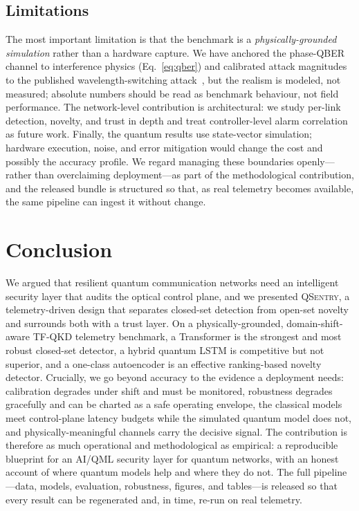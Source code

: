 \documentclass[runningheads]{llncs}
\begin{document}
\subsection{Limitations}
The most important limitation is that the benchmark is a \emph{physically-grounded simulation} rather than a hardware capture. We have anchored the phase-QBER channel to interference physics (Eq.~\eqref{eq:qber}) and calibrated attack magnitudes to the published wavelength-switching attack~\cite{peng}, but the realism is modeled, not measured; absolute numbers should be read as benchmark behaviour, not field performance. The network-level contribution is architectural: we study per-link detection, novelty, and trust in depth and treat controller-level alarm correlation as future work. Finally, the quantum results use state-vector simulation; hardware execution, noise, and error mitigation would change the cost and possibly the accuracy profile. We regard managing these boundaries openly---rather than overclaiming deployment---as part of the methodological contribution, and the released bundle is structured so that, as real telemetry becomes available, the same pipeline can ingest it without change.

\section{Conclusion}
We argued that resilient quantum communication networks need an intelligent security layer that audits the optical control plane, and we presented \textsc{QSentry}, a telemetry-driven design that separates closed-set detection from open-set novelty and surrounds both with a trust layer. On a physically-grounded, domain-shift-aware TF-QKD telemetry benchmark, a Transformer is the strongest and most robust closed-set detector, a hybrid quantum LSTM is competitive but not superior, and a one-class autoencoder is an effective ranking-based novelty detector. Crucially, we go beyond accuracy to the evidence a deployment needs: calibration degrades under shift and must be monitored, robustness degrades gracefully and can be charted as a safe operating envelope, the classical models meet control-plane latency budgets while the simulated quantum model does not, and physically-meaningful channels carry the decisive signal. The contribution is therefore as much operational and methodological as empirical: a reproducible blueprint for an AI/QML security layer for quantum networks, with an honest account of where quantum models help and where they do not. The full pipeline---data, models, evaluation, robustness, figures, and tables---is released so that every result can be regenerated and, in time, re-run on real telemetry.
\end{document}
